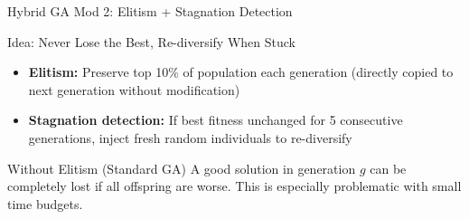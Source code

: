 \documentclass[aspectratio=43,8pt]{beamer}
\begin{document}
\begin{frame}{Hybrid GA Mod 2: Elitism + Stagnation Detection}
\begin{block}{Idea: Never Lose the Best, Re-diversify When Stuck}
\begin{itemize}
    \item \textbf{Elitism:} Preserve top 10\% of population each generation (directly copied to next generation without modification)
    \item \textbf{Stagnation detection:} If best fitness unchanged for 5 consecutive generations, inject fresh random individuals to re-diversify
\end{itemize}
\end{block}

\vspace{0.2cm}
\begin{center}
\end{center}

\begin{alertblock}{Without Elitism (Standard GA)}
A good solution in generation $g$ can be completely lost if all offspring are worse. This is especially problematic with small time budgets.
\end{alertblock}
\end{frame}
\end{document}
